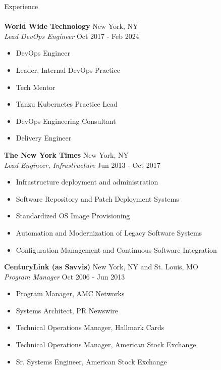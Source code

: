 \documentclass[letterpaper]{article}
\newcommand{\lineunder} {
    \vspace*{-8pt} \\
    \hspace*{-18pt} \hrulefill \\
}
\newcommand{\header} [1] {
    {\hspace*{-18pt}\vspace*{6pt} #1}
    \vspace*{-6pt} \lineunder
}
\begin{document}
\header{Experience}
\vspace{1mm}
\textbf{World Wide Technology} \hfill New York, NY\\
\textit{Lead DevOps Engineer} \hfill Oct 2017 - Feb 2024\\
\vspace{-1mm}
\begin{itemize}
	\item DevOps Engineer
	\item Leader, Internal DevOps Practice
	\item Tech Mentor
	\item Tanzu Kubernetes Practice Lead
	\item DevOps Engineering Consultant
	\item Delivery Engineer
\end{itemize}

\textbf{The New York Times} \hfill New York, NY\\
\textit{Lead Engineer, Infrastructure} \hfill Jun 2013 - Oct 2017\\
\vspace{-1mm}
\begin{itemize}
	\item Infrastructure deployment and administration
	\item Software Repository and Patch Deployment Systems
	\item Standardized OS Image Provisioning
	\item Automation and Modernization of Legacy Software Systems
	\item Configuration Management and Continuous Software Integration
\end{itemize}

\textbf{CenturyLink (as Savvis)} \hfill New York, NY and St. Louis, MO\\
\textit{Program Manager} \hfill Oct 2006 - Jun 2013\\
\vspace{-1mm}
\begin{itemize}
	\item Program Manager, AMC Networks
	\item Systems Architect, PR Newswire
	\item Technical Operations Manager, Hallmark Cards
	\item Technical Operations Manager, American Stock Exchange
	\item Sr. Systems Engineer, American Stock Exchange
\end{itemize}
\end{document}
